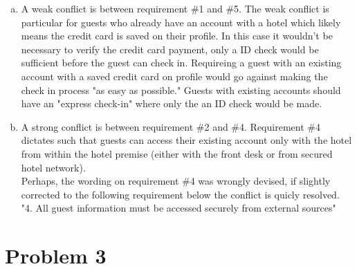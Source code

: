 \documentclass{article}
\begin{document}
\begin{enumerate}[(a)]
\item 
A weak conflict is between requirement \#1 and \#5. The weak conflict is particular for guests who already have an account with a hotel which likely means the credit card is saved on their profile. In this case it wouldn't be necessary to verify the credit card payment, only a ID check would be sufficient before the guest can check in. Requireing a guest with an existing account with a saved credit card on profile would go against making the check in process "as easy as possible." Guests with existing accounts should have an "express check-in" where only the an ID check would be made.


\item 
A strong conflict is between requirement  \#2 and \#4. Requirement \#4 dictates such that guests can access their existing account only with the hotel from  within the hotel premise (either with the front desk or from secured hotel network). \\ 

Perhaps, the wording on requirement \#4 was wrongly devised, if slightly corrected to the following requirement below the conflict is quicly resolved. \\
 
"4. All guest information must be accessed securely from external sources"

\end{enumerate}

\section*{Problem 3} 
\end{document}

